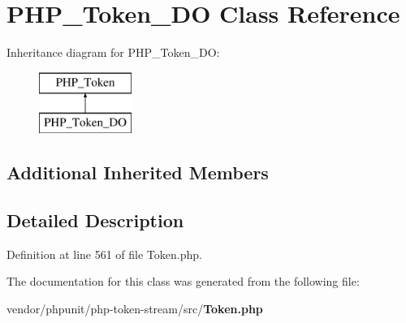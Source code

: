 \section{P\+H\+P\+\_\+\+Token\+\_\+\+D\+O Class Reference}
\label{class_p_h_p___token___d_o}
Inheritance diagram for P\+H\+P\+\_\+\+Token\+\_\+\+D\+O\+:\begin{figure}[H]
\begin{center}
\leavevmode
\includegraphics[height=2.000000cm]{class_p_h_p___token___d_o}
\end{center}
\end{figure}
\subsection*{Additional Inherited Members}


\subsection{Detailed Description}


Definition at line 561 of file Token.\+php.



The documentation for this class was generated from the following file\+:\begin{DoxyCompactItemize}
\item 
vendor/phpunit/php-\/token-\/stream/src/{\bf Token.\+php}\end{DoxyCompactItemize}
